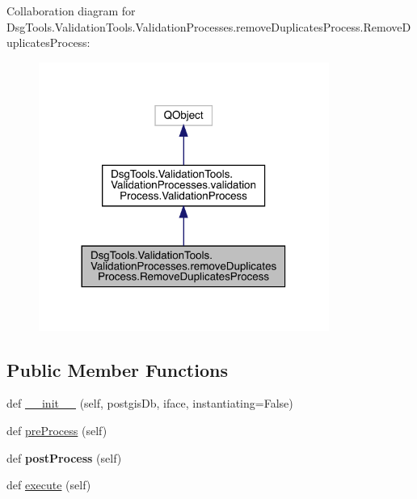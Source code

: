 Collaboration diagram for Dsg\+Tools.\+Validation\+Tools.\+Validation\+Processes.\+remove\+Duplicates\+Process.\+Remove\+Duplicates\+Process\+:
\nopagebreak
\begin{figure}[H]
\begin{center}
\leavevmode
\includegraphics[width=269pt]{class_dsg_tools_1_1_validation_tools_1_1_validation_processes_1_1remove_duplicates_process_1_1_r65f94e9bf151e64d567c7c5913333e56}
\end{center}
\end{figure}
\subsection*{Public Member Functions}
\begin{DoxyCompactItemize}
\item 
def \mbox{\hyperlink{class_dsg_tools_1_1_validation_tools_1_1_validation_processes_1_1remove_duplicates_process_1_1_remove_duplicates_process_ab81133c1290b3701f9b7983e3cc2ff89}{\+\_\+\+\_\+init\+\_\+\+\_\+}} (self, postgis\+Db, iface, instantiating=False)
\item 
def \mbox{\hyperlink{class_dsg_tools_1_1_validation_tools_1_1_validation_processes_1_1remove_duplicates_process_1_1_remove_duplicates_process_a2f158eba7f758907bc60950685c97b47}{pre\+Process}} (self)
\item 
\mbox{\label{class_dsg_tools_1_1_validation_tools_1_1_validation_processes_1_1remove_duplicates_process_1_1_remove_duplicates_process_ae1c31ed26dc72ff3faceb0d4cba4f1ae}} 
def {\bfseries post\+Process} (self)
\item 
def \mbox{\hyperlink{class_dsg_tools_1_1_validation_tools_1_1_validation_processes_1_1remove_duplicates_process_1_1_remove_duplicates_process_a2829aa0089a7a9d16f91620a73ad2a25}{execute}} (self)
\end{DoxyCompactItemize}
